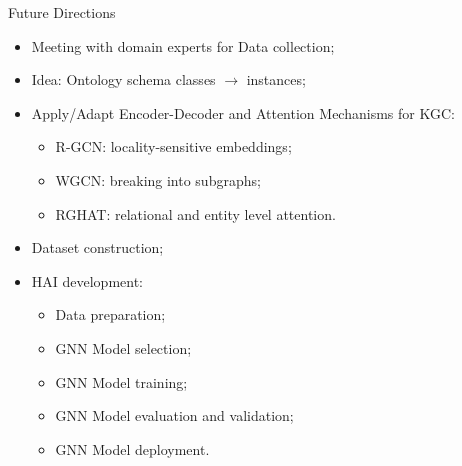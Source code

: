 \begin{tframe}{Future Directions}
    \begin{itemize}
        \item Meeting with domain experts for Data collection;
        \item Idea: Ontology schema classes $\rightarrow$ instances;
        \item Apply/Adapt Encoder-Decoder and Attention Mechanisms for KGC:
        \begin{itemize}
            \item R-GCN: locality-sensitive embeddings;
            \item WGCN: breaking into subgraphs;
            \item RGHAT: relational and entity level attention.
        \end{itemize}
        \item Dataset construction;
        \item HAI development:
        \begin{itemize}
            \item Data preparation;
            \item GNN Model selection;
            \item GNN Model training;
            \item GNN Model evaluation and validation;
            \item GNN Model deployment.
        \end{itemize}
    \end{itemize}
\end{tframe}